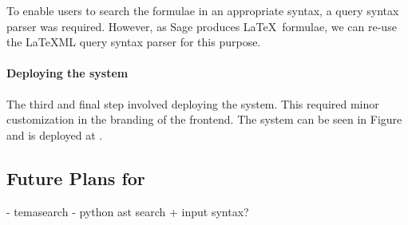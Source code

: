 To enable users to search the formulae in an appropriate syntax, a query syntax parser was required. 
However, as Sage produces \LaTeX\ formulae, we can re-use the {\LaTeX}ML query syntax parser for this purpose. 

\paragraph{Deploying the system}

The third and final step involved deploying the system.
This required minor customization in the branding of the frontend. 
The system can be seen in Figure and is deployed at .


\begin{oldpart}{}
\subsection{Future Plans for \MWS}

- temasearch
- python ast search + input syntax?
\end{oldpart}


